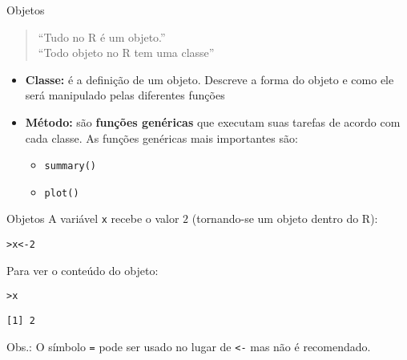 \documentclass[10pt,handout]{beamer}\usepackage{graphicx, color}
\makeatletter
\newenvironment{kframe}{%
 \def\at@end@of@kframe{}%
 \ifinner\ifhmode%
  \def\at@end@of@kframe{\end{minipage}}%
  \begin{minipage}{\columnwidth}%
 \fi\fi%
 \def\FrameCommand##1{\hskip\@totalleftmargin \hskip-\fboxsep
 \colorbox{shadecolor}{##1}\hskip-\fboxsep
     \hskip-\linewidth \hskip-\@totalleftmargin \hskip\columnwidth}%
 \MakeFramed {\advance\hsize-\width
   \@totalleftmargin\z@ \linewidth\hsize
   \@setminipage}}%
 {\par\unskip\endMakeFramed%
 \at@end@of@kframe}
\newenvironment{knitrout}{}{} %
\makeatother
\begin{document}
\begin{frame}[fragile=singleslide]{Objetos}
\begin{quote}
    ``Tudo no R é um objeto.''\\
    ``Todo objeto no R tem uma classe''
\end{quote}
\begin{itemize}
\item \textbf{Classe:} é a definição de um objeto. Descreve a forma do
  objeto e como ele será manipulado pelas diferentes funções
\item \textbf{Método:} são \textbf{funções genéricas} que executam suas
  tarefas de acordo com cada classe. As funções genéricas mais
  importantes são:
  \begin{itemize}
  \item \verb|summary()|
  \item \verb|plot()|
  \end{itemize}
\end{itemize}
\end{frame}

\begin{frame}[fragile=singleslide]{Objetos}
A variável \texttt{x} recebe o valor $2$ (tornando-se um objeto dentro do R):
\begin{knitrout}\small
{}\color{fgcolor}\begin{kframe}
\begin{alltt}
> x <- 2
\end{alltt}
\end{kframe}
\end{knitrout}

\begin{center}
\end{center}
Para ver o conteúdo do objeto:
\begin{knitrout}\small
{}\color{fgcolor}\begin{kframe}
\begin{alltt}
> x
\end{alltt}
\begin{verbatim}
[1] 2
\end{verbatim}
\end{kframe}
\end{knitrout}

Obs.: O símbolo \verb|=| pode ser usado no lugar de \verb|<-| mas não é
recomendado.
\end{frame}
\end{document}

